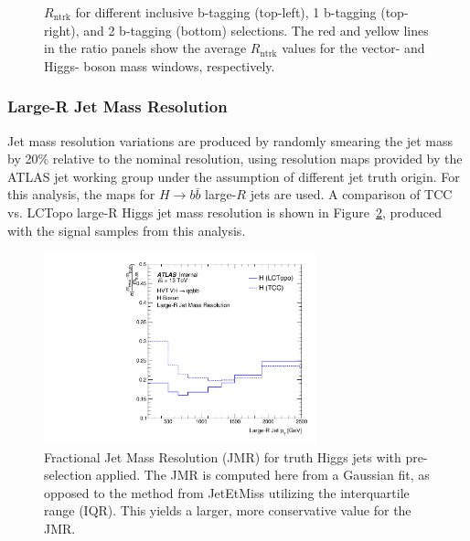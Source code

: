 \begin{figure}[htbp!]
\begin{center}
\end{center}
\caption{$R_{\mathrm{ntrk}}$ for different inclusive b-tagging (top-left), 1 b-tagging (top-right), and 2 b-tagging (bottom) selections. The red and yellow lines in the ratio panels show the average $R_{\mathrm{ntrk}}$ values for the vector- and Higgs- boson mass windows, respectively.}
\label{fig:double_ratio}
\end{figure}

\subsubsection{Large-R Jet Mass Resolution}
Jet mass resolution variations are produced by randomly smearing the jet mass by 20\% relative to the nominal resolution, using resolution maps provided by the ATLAS jet working group under the assumption of different jet truth origin.
For this analysis, the maps for $H \rightarrow b\bar{b}$ large-$R$ jets are used.
A comparison of TCC vs. LCTopo large-R Higgs jet mass resolution is shown in Figure~\ref{fig:jmr_higgs}, produced with the signal samples from this analysis.

\begin{figure}[htbp!]
\begin{center}
\includegraphics[width=0.7\textwidth]{JMR_Higgs_TCC.pdf}
\end{center}
\caption{
    Fractional Jet Mass Resolution (JMR) for truth Higgs jets with pre-selection applied.
    The JMR is computed here from a Gaussian fit, as opposed to the method from JetEtMiss utilizing the interquartile range (IQR).
    This yields a larger, more conservative value for the JMR.
}
\label{fig:jmr_higgs}
\end{figure}

